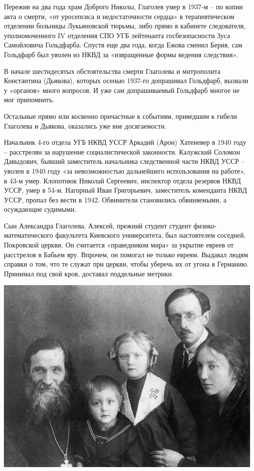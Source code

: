 Пережив на два года храм Доброго Николы, Глаголев умер в 1937-м – по копии акта о смерти, «от уросепсиса и недостаточности сердца» в терапевтическом отделении больницы Лукьяновской тюрьмы, либо прямо в кабинете следователя, уполномоченного IV отделения СПО УГБ лейтенанта госбезопасности Зуса Самойловича Гольдфарба. Спустя еще два года, когда Ежова сменил Берия,  сам Гольдфарб был уволен из НКВД за «извращенные формы ведения следствия».

В начале шестидесятых обстоятельства смерти Глаголева и митрополита Константина (Дьякова), которых осенью 1937-го допрашивал Гольдфарб, вызвали у «органов» много вопросов. И уже сам допрашиваемый Гольдфарб многое не мог припомнить. 

Остальные прямо или косвенно причастные к событиям, приведшим к гибели Глаголева и Дьякова, оказались уже вне досягаемости.

Начальник 4-го отдела УГБ НКВД УССР Аркадий (Ар\-он) Хатеневер в 1940 году – расстрелян за нарушение социалистической законности. Калужский Соломон Давыдович, бывший заместитель начальника следственной части НКВД УССР – уволен в 1940 году «за невозможностью дальнейшего использования на работе», в 43-м умер. Клопотнюк Николай Сергеевич, инспектор отдела резервов НКВД УССР, умер в 54-м. Нагорный Иван Григорьевич, заместитель коменданта НКВД УССР, пропал без вести в 1942. Обвинители становились обвиняемыми, а осуждающие судимыми.

Сын Александра Глаголева, Алексей, прежний студент студент физико-математического факультета Киевского университета, был настоятелем соседней, Покровской церкви. Он считается «праведником мира» за укрытие евреев от расстрелов в Бабьем яру. Впрочем, он помогал не только евреям. Выдавал людям справки о том, что те служат при церкви, чтобы уберечь их от угона в Германию. Принимал под свой кров, доставал поддельные метрики.

\begin{center}
\includegraphics[width=\linewidth]{chast-colebanie-osnov/borichev-tok/glagol-01.jpg}
\end{center}

